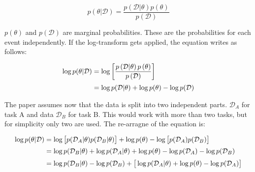 \begin{equation}
    p \left( \theta | \mathcal{D} \right) = \frac{p \left(\mathcal{D}|\theta\right) p\left(\theta\right)}{p \left( \mathcal{D} \right)}
\end{equation}

$p \left( \theta \right)$ and $p \left( \mathcal{D} \right)$ are marginal probabilities. These are the probabilities for each event independently.
\newline
If the log-transform gets applied, the equation writes as follows: \cite{elastic-weight-consolidation, schaeffer_ewc}

\begin{equation}
    \setlength{\jot}{5pt}
    \begin{split}
        \log p(\theta | \mathcal{D}) & = \log \left[ 
                \frac{p \left(\mathcal{D}|\theta\right) p\left(\theta\right)}{p \left( \mathcal{D} \right)} 
            \right]
        \\
        & = \log p(\mathcal{D} | \theta) + \log p(\theta) - \log p(\mathcal{D})
    \end{split}
    \label{eq:bayes_applied_log}
\end{equation}

The paper assumes now that the data is split into two independent parts. $\mathcal{D}_A$ for task A and data $\mathcal{D}_B$ for task B.
This would work with more than two tasks, but for simplicity only two are used.
The re-arragne of the equation is: \cite{elastic-weight-consolidation, schaeffer_ewc}

\begin{equation}
    \setlength{\jot}{5pt}
    \begin{split}
        \log p(\theta | \mathcal{D}) 
        & = \log \big[
                p(\mathcal{D}_A | \theta) p(\mathcal{D}_B | \theta)
                \big]
            + \log p(\theta)
            - \log \big[
                p(\mathcal{D}_A) p(\mathcal{D}_B) 
             \big]
        \\
        & = \log p(\mathcal{D}_B | \theta)
            + \log p(\mathcal{D}_A | \theta)
            + \log p(\theta)
            - \log p(\mathcal{D}_A)
            - \log p(\mathcal{D}_B)
        \\
        & = \log p(\mathcal{D}_B | \theta)
            - \log p(\mathcal{D}_B)
            + \big[
                \log p(\mathcal{D}_A | \theta)
                + \log p(\theta)
                - \log p(\mathcal{D}_A)
                \big]
    \end{split}
\end{equation}

